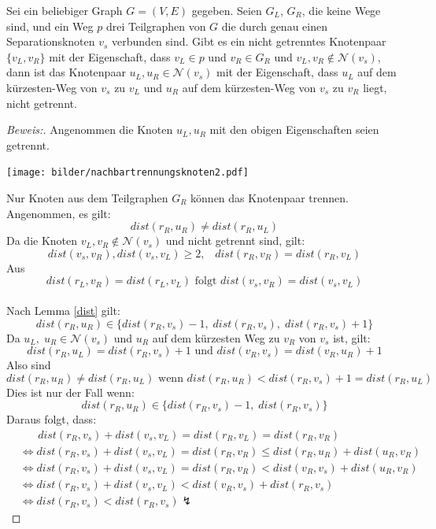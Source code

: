 \begin{lem}
\label{nachbartrennungsknoten2}
Sei ein beliebiger Graph $G=(V,E)$ gegeben. Seien $G_L$, $G_R$, die keine Wege sind, und ein Weg $p$ drei Teilgraphen von $G$ die durch genau einen Separationsknoten $v_s$ verbunden sind. Gibt es ein nicht getrenntes Knotenpaar $\{v_L,v_R\}$ mit der Eigenschaft, dass $v_L\in p$ und $v_R \in G_R$ und $v_L, v_R \notin \mathcal{N}(v_s)$, dann ist das Knotenpaar $u_L,u_R \in \mathcal{N}(v_s)$ mit der Eigenschaft, dass $u_L$ auf dem kürzesten-Weg von $v_s$ zu $v_L$ und $u_R$ auf dem kürzesten-Weg von $v_s$ zu $v_R$ liegt, nicht getrennt.
\end{lem}
\par
\begin{proof}[Beweis:] Angenommen die Knoten $u_L,u_R$ mit den obigen Eigenschaften seien getrennt.
\begin{floatingfigure}[r]{200pt}
\centering
\texttt{[image: bilder/nachbartrennungsknoten2.pdf]}
\end{floatingfigure}
Nur Knoten aus dem Teilgraphen $G_R$ können das Knotenpaar trennen. Angenommen, es gilt: $$dist(r_R,u_R)\neq dist(r_R,u_L)$$
\newline
Da die Knoten $v_L, v_R \notin \mathcal{N}(v_s)$ und nicht getrennt sind, gilt: $$dist(v_s,v_R),dist(v_s,v_L)\geq 2,\;\;\; dist(r_R,v_R)=dist(r_R,v_L)$$ 
Aus $$dist(r_L,v_R)=dist(r_L,v_L) \text{ folgt }dist(v_s,v_R)=dist(v_s,v_L)$$\\
Nach Lemma \ref{dist} gilt: $$dist(r_R,u_R)\in \{dist(r_R,v_s)-1,\; dist(r_R,v_s),\;dist(r_R,v_s)+1\}$$
Da $u_L,\;u_R \in \mathcal{N}(v_s)$ und $u_R$ auf dem kürzesten Weg zu $v_R$ von $v_s$ ist, gilt: $$dist(r_R,u_L)=dist(r_R,v_s)+1\text{ und }dist(v_R,v_s)=dist(v_R,u_R)+1$$
Also sind $$dist(r_R,u_R)\neq dist(r_R,u_L)\text{ wenn }dist(r_R,u_R)<dist(r_R,v_s)+1=dist(r_R,u_L)$$
Dies ist nur der Fall wenn: $$dist(r_R,u_R)\in \{dist(r_R,v_s)-1,\; dist(r_R,v_s)\}$$
Daraus folgt, dass:
\begin{align*}
&\;\;\;\;\;\;dist(r_R,v_s)+dist(v_s,v_L)=dist(r_R,v_L)=dist(r_R,v_R)\\
&\Leftrightarrow  dist(r_R,v_s)+dist(v_s,v_L)=dist(r_R,v_R) \leq dist(r_R,u_R)+dist(u_R,v_R)\\
&\Leftrightarrow  dist(r_R,v_s)+dist(v_s,v_L)=dist(r_R,v_R)< dist(v_R,v_s)+dist(u_R,v_R)\\
&\Leftrightarrow  dist(r_R,v_s)+dist(v_s,v_L)< dist(v_R,v_s)+dist(r_R,v_s)\\
&\Leftrightarrow  dist(r_R,v_s)<dist(r_R,v_s)\lightning
\end{align*}
\end{proof}
\par

